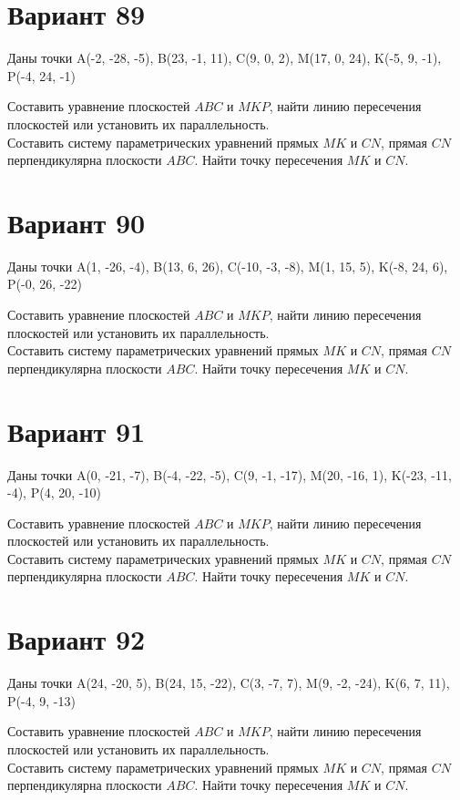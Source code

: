 \documentclass[11pt]{article}
\begin{document}
\section*{Вариант 89}
Даны точки A(-2, -28, -5), B(23, -1, 11), C(9, 0, 2), M(17, 0, 24), K(-5, 9, -1), P(-4, 24, -1)

Составить уравнение плоскостей $ABC$ и $MKP$, найти линию пересечения плоскостей или установить их параллельность.\\
Составить систему параметрических уравнений прямых $MK$ и $CN$, прямая $CN$ перпендикулярна плоскости $ABC$. Найти точку пересечения $MK$ и $CN$.

\section*{Вариант 90}
Даны точки A(1, -26, -4), B(13, 6, 26), C(-10, -3, -8), M(1, 15, 5), K(-8, 24, 6), P(-0, 26, -22)

Составить уравнение плоскостей $ABC$ и $MKP$, найти линию пересечения плоскостей или установить их параллельность.\\
Составить систему параметрических уравнений прямых $MK$ и $CN$, прямая $CN$ перпендикулярна плоскости $ABC$. Найти точку пересечения $MK$ и $CN$.

\section*{Вариант 91}
Даны точки A(0, -21, -7), B(-4, -22, -5), C(9, -1, -17), M(20, -16, 1), K(-23, -11, -4), P(4, 20, -10)

Составить уравнение плоскостей $ABC$ и $MKP$, найти линию пересечения плоскостей или установить их параллельность.\\
Составить систему параметрических уравнений прямых $MK$ и $CN$, прямая $CN$ перпендикулярна плоскости $ABC$. Найти точку пересечения $MK$ и $CN$.

\section*{Вариант 92}
Даны точки A(24, -20, 5), B(24, 15, -22), C(3, -7, 7), M(9, -2, -24), K(6, 7, 11), P(-4, 9, -13)

Составить уравнение плоскостей $ABC$ и $MKP$, найти линию пересечения плоскостей или установить их параллельность.\\
Составить систему параметрических уравнений прямых $MK$ и $CN$, прямая $CN$ перпендикулярна плоскости $ABC$. Найти точку пересечения $MK$ и $CN$.
\end{document}

